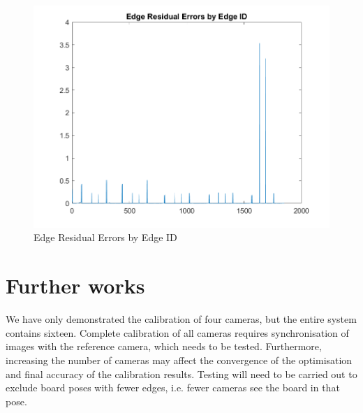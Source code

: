 \begin{figure}[h]
\centering
\includegraphics[width=1\textwidth]{Images/Edge Residual Errors by Edge ID.png}
\caption{Edge Residual Errors by Edge ID}
\end{figure}



\clearpage
\section{Further works}

We have only demonstrated the calibration of four cameras, but the entire system contains sixteen. Complete calibration of all cameras requires synchronisation of images with the reference camera, which needs to be tested. Furthermore, increasing the number of cameras may affect the convergence of the optimisation and final accuracy of the calibration results. Testing will need to be carried out to exclude board poses with fewer edges, i.e. fewer cameras see the board in that pose.

